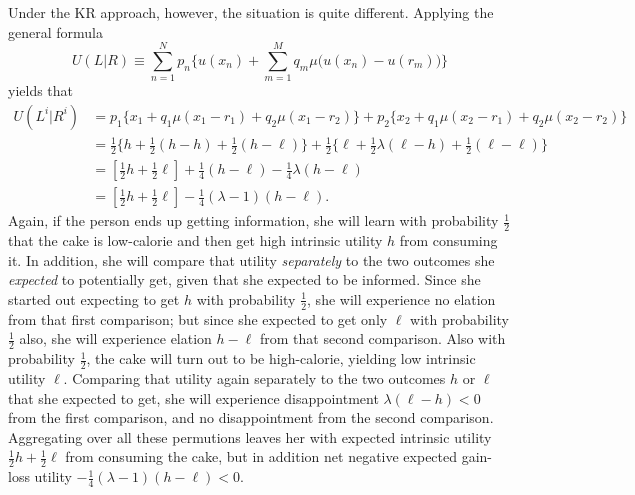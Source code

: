 \documentclass[11pt,reqno]{amsart}
\newcommand{\half}{\tfrac{1}{2}}
\newcommand{\qrtr}{\tfrac{1}{4}}
\begin{document}
Under the KR approach, however, the situation is quite different. Applying the
general formula
\begin{equation*}
  U(L|R) \equiv \sum_{n=1}^N p_n\biggl\{u(x_n) + \sum_{m=1}^M q_m
\mu\bigl(u(x_n) - u(r_m)\bigr)\biggr\}
\end{equation*}
yields that
\begin{align*}
  U(L^i|R^i) 
&= p_1\bigl\{x_1 + q_1\mu(x_1 - r_1) + q_2\mu(x_1 - r_2)\bigr\}
 + p_2\bigl\{x_2 + q_1\mu(x_2 - r_1) + q_2\mu(x_2 - r_2)\bigr\}\\
&= \half\bigl\{h + \half(h - h) + \half(h - \ell)\bigr\}
 + \half\bigl\{\ell + \half\lambda(\ell - h) + \half(\ell - \ell)\bigr\}\\
&= [\half h + \half \ell] + 
    \qrtr (h-\ell) - \qrtr \lambda(h-\ell)\\
&= [\half h + \half \ell] - \qrtr(\lambda-1)(h - \ell).
\end{align*}
Again, if the person ends up getting information, she will learn with
probability $\half$ that the cake is low-calorie and then get high intrinsic
utility $h$ from consuming it. In addition, she will compare that utility {\em
separately} to the two outcomes she {\em expected} to potentially get, given
that she expected to be informed. Since she started out expecting to get $h$
with probability $\half$, she will experience no elation from that first
comparison; but since she expected to get only $\ell$ with probability $\half$
also, she will experience elation $h-\ell$ from that second comparison. Also
with probability $\half$, the cake will turn out to be high-calorie, yielding
low intrinsic utility $\ell$. Comparing that utility again separately to the
two outcomes $h$ or $\ell$ that she expected to get, she will experience
disappointment $\lambda(\ell - h) < 0$ from the first comparison, and no
disappointment from the second comparison. Aggregating over all these
permutions leaves her with expected intrinsic utility $\half h + \half \ell$
from consuming the cake, but in addition net negative expected gain-loss
utility $-\qrtr(\lambda - 1)(h - \ell) < 0$. 
\end{document}
